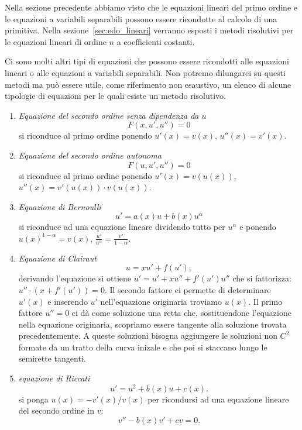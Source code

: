 Nella sezione precedente abbiamo visto che le equazioni lineari del primo ordine
e le equazioni
a variabili separabili possono essere ricondotte al calcolo di una primitiva.
Nella sezione~\ref{sec:edo_lineari} verranno esposti i metodi risolutivi per le
equazioni lineari di ordine $n$ a coefficienti costanti.

Ci sono molti altri tipi di equazioni che possono essere ricondotti
alle equazioni lineari o alle equazioni a variabili separabili.
Non potremo dilungarci su questi metodi ma può essere utile,
come riferimento non esaustivo,
un elenco di alcune tipologie di equazioni per le quali esiste un metodo
risolutivo.

\begin{enumerate}
\item \emph{Equazione del secondo ordine senza dipendenza da $u$}
\[
  F(x, u', u'') = 0
\]
si riconduce al primo ordine ponendo $u'(x) = v(x)$, $u''(x) = v'(x)$.

\item \emph{Equazione del secondo ordine autonoma}
\[
  F(u, u', u'') = 0
\]
si riconduce al primo ordine
ponendo $u'(x) = v(u(x))$,
$u''(x) = v'(u(x))\cdot v(u(x))$.

\item \emph{Equazione di Bernoulli}
%
%
\[
  u' = a(x) u + b(x) u^\alpha
\]
si riconduce ad una equazione lineare dividendo tutto per $u^\alpha$
e ponendo $u(x)^{1-\alpha} = v(x)$, $\frac{u'}{u^\alpha} = \frac{v'}{1-\alpha}$.

\item \emph{Equazione di Clairaut}
%
%
\[
  u = x u' + f(u');
\]
derivando l'equazione si ottiene $ u' = u' + xu'' + f'(u')u''$
che si fattorizza: $u''\cdot(x+f'(u'))=0$. 
Il secondo fattore ci permette di determinare $u'(x)$ e inserendo $u'$
nell'equazione originaria troviamo $u(x)$. 
Il primo fattore $u''=0$ ci dà come soluzione una retta che, sostituendone 
l'equazione nella equazione originaria, scopriamo essere tangente 
alla soluzione trovata precedentemente.
A queste soluzioni bisogna aggiungere le soluzioni non $C^2$ formate da un tratto
della curva inizale e che poi si staccano lungo le semirette tangenti.

\item \emph{equazione di Riccati}
%
%
\[
  u' = u^2 + b(x) u + c(x).
\]
si ponga $u(x) = -v'(x)/v(x)$ per ricondursi ad
una equazione lineare del secondo ordine in $v$:
\[
 v'' -  b(x) v' + c v = 0.
\]
\end{enumerate}

